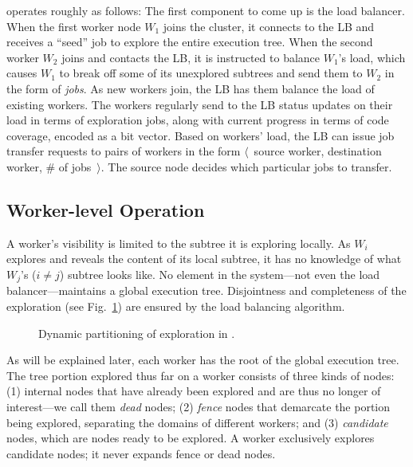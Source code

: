 \cnine operates roughly as follows: The first component to come up is the load balancer.  When the first worker node $W_1$ joins the \cnine cluster, it connects to the LB and receives a ``seed'' job to explore the entire execution tree.  When the second worker $W_2$ joins and contacts the LB, it is instructed to balance $W_1$'s load, which causes $W_1$ to break off some of its unexplored subtrees and send them to $W_2$ in the form of {\em jobs}.  As new workers join, the LB has them balance the load of existing workers.  The workers regularly send to the LB status updates on their load in terms of exploration jobs, along with current progress in terms of code coverage, encoded as a bit vector.  Based on workers' load, the LB can issue job transfer requests to pairs of workers in the form $\langle$~source worker, destination worker, \# of jobs~$\rangle$.  The source node decides which particular jobs to transfer.

\subsection{Worker-level Operation}
\label{sec:workerView}

A worker's visibility is limited to the subtree it is exploring locally.  As $W_i$ explores and reveals the content of its local subtree, it has no knowledge of what $W_j$'s ($i\ne j$) subtree looks like.  No element in the system---not even the load balancer---maintains a global execution tree.  Disjointness and completeness 
of the exploration (see Fig.~\ref{fig:architecture}) are ensured by the load balancing algorithm.

\begin{figure}[h!]
  \centering
  \caption{Dynamic partitioning of exploration in \cnine.}
 \label{fig:architecture}
\end{figure}

\newcommand{\dead}{dead\xspace}
\newcommand{\fence}{fence\xspace}
\newcommand{\candidate}{candidate\xspace}
\newcommand{\virtual}{virtual\xspace}
\newcommand{\materialized}{materialized\xspace}

As will be explained later, each worker has the root of the global execution tree.  The tree portion explored thus far on a worker consists of three kinds of nodes: (1) internal nodes that have already been explored and are thus no longer of interest---we call them {\em \dead} nodes; (2) {\em \fence} nodes that demarcate the portion being explored, separating the domains of different workers; and (3) {\em \candidate} nodes, which are nodes ready to be explored.  A worker exclusively explores \candidate nodes; it never expands \fence or \dead nodes.

